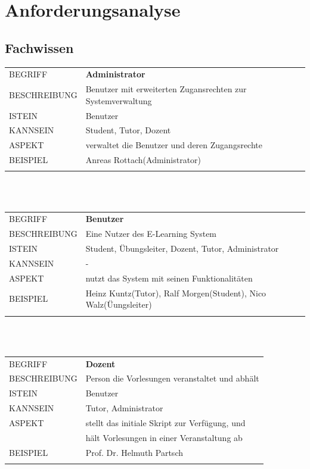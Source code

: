 \documentclass[12pt,a4paper]{article}
\begin{document}
\section{Anforderungsanalyse}
\subsection{Fachwissen}
\begin{tabular}{l p{12cm}}  
	BEGRIFF 	 & \textbf{Administrator} \\ 
	BESCHREIBUNG & Benutzer mit erweiterten Zugansrechten zur Systemverwaltung\\ 
	ISTEIN   	 & Benutzer \\
	KANNSEIN 	 & Student, Tutor, Dozent \\ 
	ASPEKT   	 & verwaltet die Benutzer und deren Zugangsrechte\\
	BEISPIEL 	 & Anreas Rottach(Administrator)\\\\
	\hline
\end{tabular}\\\\  

\begin{tabular}{l p{12cm}}
	BEGRIFF 	 & \textbf{Benutzer} \\ 
	BESCHREIBUNG & Eine Nutzer des E-Learning System \\ 
	ISTEIN   	 & Student, Übungsleiter, Dozent, Tutor, Administrator \\
	KANNSEIN 	 &   - \\ 
	ASPEKT   	 & nutzt das System mit seinen Funktionalitäten\\
	BEISPIEL 	 & Heinz Kuntz(Tutor), Ralf Morgen(Student), Nico Walz(Üungsleiter)\\\\
	\hline
\end{tabular}\\\\    

\begin{tabular}{l p{12cm}}
	BEGRIFF 	 & \textbf{Dozent} \\ 
	BESCHREIBUNG & Person die Vorlesungen veranstaltet und abhält \\ 
	ISTEIN   	 & Benutzer\\
	KANNSEIN 	 & Tutor, Administrator \\ 
	ASPEKT   	 & stellt das initiale Skript zur Verfügung, und\\
	&  hält Vorlesungen in einer Veranstaltung ab\\
	BEISPIEL 	 & Prof. Dr. Helmuth Partsch\\\\
	\hline
\end{tabular}\\\\   
\end{document}

